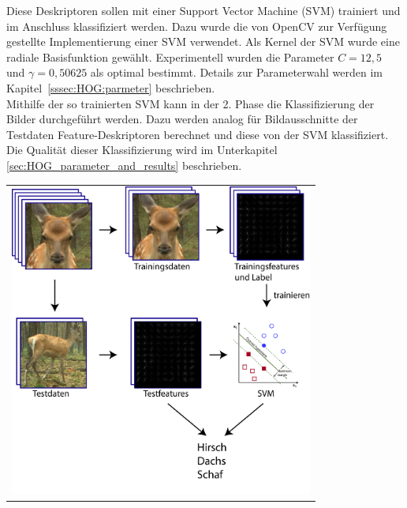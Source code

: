 Diese Deskriptoren sollen mit einer Support Vector Machine (SVM) trainiert und im Anschluss klassifiziert werden. Dazu wurde die von OpenCV zur Verfügung gestellte Implementierung einer SVM verwendet. Als Kernel der SVM wurde eine radiale Basisfunktion gewählt. Experimentell wurden die Parameter $C = 12,5$ und $\gamma = 0,50625$ als optimal bestimmt. Details zur Parameterwahl werden im Kapitel~\ref{sssec:HOG:parmeter} beschrieben.\\
Mithilfe der so trainierten SVM kann in der 2. Phase die Klassifizierung der Bilder durchgeführt werden. Dazu werden analog für Bildausschnitte der Testdaten Feature-Deskriptoren berechnet und diese von der SVM klassifiziert. Die Qualität dieser Klassifizierung wird im Unterkapitel \ref{sec:HOG_parameter_and_results} beschrieben.
\begin{center}
\begin{tabular}{c}
\includegraphics[trim={0 0cm 0cm 0cm},clip=true,width=10cm]{img/ClassificationOverview.png}
\end{tabular}
\label{fig:hog_classification_ov}
\end{center}
